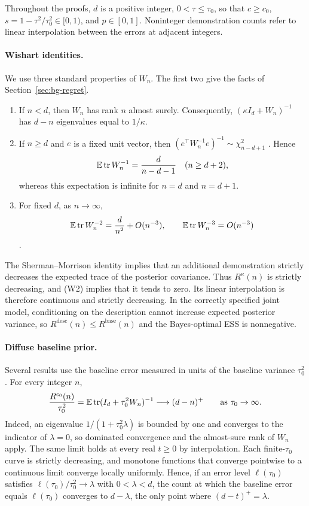 Throughout the proofs, $d$ is a positive integer, $0<\tau\le\tau_0$, so that $c\ge c_0$, $s=1-\tau^2/\tau_0^2\in[0,1)$, and $p\in[0,1]$. Noninteger demonstration counts refer to linear interpolation between the errors at adjacent integers.

\paragraph{Wishart identities.}
We use three standard properties of $W_n$. The first two give the facts of Section~\ref{sec:bg-regret}.
\begin{enumerate}[label=(W\arabic*),leftmargin=*]
    \item If $n<d$, then $W_n$ has rank $n$ almost surely. Consequently, $(\kappa I_d+W_n)^{-1}$ has $d-n$ eigenvalues equal to $1/\kappa$.
    \item If $n\ge d$ and $e$ is a fixed unit vector, then $(e^\top W_n^{-1}e)^{-1}\sim\chi^2_{n-d+1}$ \citep[Theorem~3.2.12]{muirhead1982}. Hence
    \[
    \mathbb{E}\operatorname{tr}W_n^{-1}=\frac{d}{n-d-1}\quad(n\ge d+2),
    \]
    whereas this expectation is infinite for $n=d$ and $n=d+1$.
    \item For fixed $d$, as $n\to\infty$,
    \[
    \mathbb{E}\operatorname{tr}W_n^{-2}=\frac{d}{n^2}+O(n^{-3}),
    \qquad
    \mathbb{E}\operatorname{tr}W_n^{-3}=O(n^{-3})
    \]
    \citep{vonrosen1988}.
\end{enumerate}
The Sherman--Morrison identity implies that an additional demonstration strictly decreases the expected trace of the posterior covariance. Thus $R^\kappa(n)$ is strictly decreasing, and (W2) implies that it tends to zero. Its linear interpolation is therefore continuous and strictly decreasing. In the correctly specified joint model, conditioning on the description cannot increase expected posterior variance, so $R^{\mathrm{desc}}(n)\le R^{\mathrm{base}}(n)$ and the Bayes-optimal ESS is nonnegative.

\paragraph{Diffuse baseline prior.}
Several results use the baseline error measured in units of the baseline variance $\tau_0^2$. For every integer $n$,
\[
\frac{R^{c_0}(n)}{\tau_0^2}
=\mathbb{E}\operatorname{tr}(I_d+\tau_0^2W_n)^{-1}
\longrightarrow(d-n)^+
\qquad\text{as }\tau_0\to\infty.
\]
Indeed, an eigenvalue $1/(1+\tau_0^2\lambda)$ is bounded by one and converges to the indicator of $\lambda=0$, so dominated convergence and the almost-sure rank of $W_n$ apply. The same limit holds at every real $t\ge0$ by interpolation. Each finite-$\tau_0$ curve is strictly decreasing, and monotone functions that converge pointwise to a continuous limit converge locally uniformly. Hence, if an error level $\ell(\tau_0)$ satisfies $\ell(\tau_0)/\tau_0^2\to\lambda$ with $0<\lambda<d$, the count at which the baseline error equals $\ell(\tau_0)$ converges to $d-\lambda$, the only point where $(d-t)^+=\lambda$.

